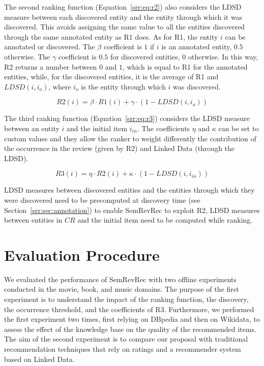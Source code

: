 The second ranking function (Equation~\ref{srr:eq:r2}) also considers the LDSD measure between each discovered entity and the entity through which it was discovered. This avoids assigning the same value to all the entities discovered through the same annotated entity as R1 does. 
As for R1, the entity $i$ can be annotated or discovered. The $\beta$ coefficient is $1$ if $i$ is an annotated entity, $0.5$ otherwise. The $\gamma$ coefficient is $0.5$ for discovered entities, $0$ otherwise. In this way, R2 returns a number between $0$ and $1$, which is equal to R1 for the annotated entities, while, for the discovered entities, it is the average of R1 and $LDSD(i,i_o)$, where $i_o$ is the entity through which $i$ was discovered.

\begin{equation}
\label{srr:eq:r2}
\mathit{R2}(i) = \beta \cdot \mathit{R1}(i) + \gamma \cdot (1 - \mathit{LDSD}(i, i_o))
\end{equation}

The third ranking function (Equation~\ref{srr:eq:r3}) considers the LDSD measure between an entity $i$ and the initial item $i_{in}$. The coefficients $\eta$ and $\kappa$ can be set to custom values and they allow the ranker to weight differently the contribution of the occurrence in the review (given by R2) and Linked Data (through the LDSD).

\begin{equation}
\label{srr:eq:r3}
\mathit{R3}(i) = \eta \cdot \mathit{R2}(i) + \kappa \cdot (1- \mathit{LDSD}(i, i_{in}))
\end{equation}

LDSD measures between discovered entities and the entities through which they were discovered need to be precomputed at discovery time (see Section~\ref{srr:sec:annotation}) to enable SemRevRec to exploit R2, LDSD measures between entities in $CR$ and the initial item need to be computed while ranking.%

\section{Evaluation Procedure}
\label{srr:sec:eval}

We evaluated the performance of SemRevRec with two offline experiments conducted in the movie, book, and music domains. The purpose of the first experiment is to understand the impact of the ranking function, the discovery, the occurrence threshold, and the coefficients of R3. Furthermore, we performed the first experiment two times, first relying on DBpedia and then on Wikidata, to assess the effect of the knowledge base on the quality of the recommended items. The aim of the second experiment is to compare our proposal with traditional recommendation techniques that rely on ratings and a recommender system based on Linked Data.


